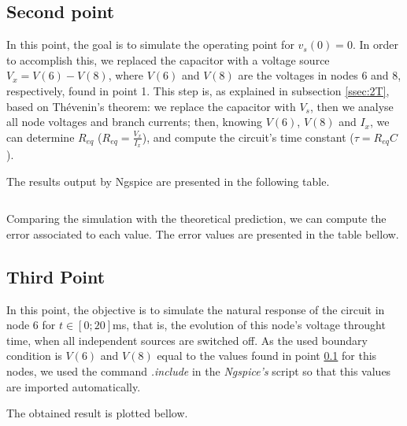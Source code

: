 \subsection{Second point}
\label{ssec:2S}

\par In this point, the goal is to simulate the operating point for $v_s(0)=0$. In order to accomplish this, we replaced the capacitor with a voltage source $V_x=V(6)-V(8)$, where $V(6)$ and $V(8)$ are the voltages in nodes 6 and 8, respectively, found in point 1. This step is, as explained in subsection \ref{ssec:2T}, based on Thévenin's theorem: we replace the capacitor with $V_s$, then we analyse all node voltages and branch currents; then, knowing $V(6)$, $V(8)$ and $I_x$, we can determine $R_{eq}$ ($R_{eq}=\frac{V_x}{I_x}$), and compute the circuit's time constant ($\tau = R_{eq}C$).
\par The results output by Ngspice are presented in the following table.

\vspace{5mm}
\begin{table}[H]
\centering
\begin{tabularx}{0.6\textwidth} {
  | >{\raggedright\arraybackslash}X
  | >{\raggedleft\arraybackslash}X | }
 \hline

\end{tabularx}
\end{table}
\vspace{5mm}

\par Comparing the simulation with the theoretical prediction, we can compute the error associated to each value. The error values are presented in the table bellow.

\subsection{Third Point}
\label{ssec:3S}

\par In this point, the objective is to simulate the natural response of the circuit in node 6 for $t \in[0;20]$ms, that is, the evolution of this node's voltage throught time, when all independent sources are switched off. As the used boundary condition is $V(6)$ and $V(8)$ equal to the values found in point \ref{ssec:2S} for this nodes, we used the command \textit{.include} in the \textit{Ngspice's} script so that this values are imported automatically.
\par The obtained result is plotted bellow.

